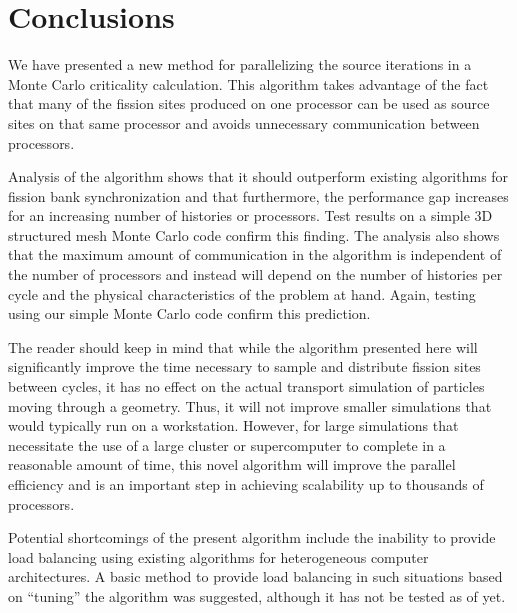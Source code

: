 \section{Conclusions}
\label{sec:conclusions}

We have presented a new method for parallelizing the source iterations
in a Monte Carlo criticality calculation. This algorithm takes
advantage of the fact that many of the fission sites produced on one
processor can be used as source sites on that same processor and
avoids unnecessary communication between processors.

Analysis of the algorithm shows that it should outperform existing
algorithms for fission bank synchronization and that furthermore, the
performance gap increases for an increasing number of histories or
processors. Test results on a simple 3D structured mesh Monte Carlo
code confirm this finding. The analysis also shows that the maximum
amount of communication in the algorithm is independent of the number
of processors and instead will depend on the number of histories per
cycle and the physical characteristics of the problem at hand. Again,
testing using our simple Monte Carlo code confirm this prediction.

The reader should keep in mind that while the algorithm presented here
will significantly improve the time necessary to sample and distribute
fission sites between cycles, it has no effect on the actual transport
simulation of particles moving through a geometry. Thus, it will not
improve smaller simulations that would typically run on a
workstation. However, for large simulations that necessitate the use
of a large cluster or supercomputer to complete in a reasonable amount
of time, this novel algorithm will improve the parallel efficiency and
is an important step in achieving scalability up to thousands of
processors.

Potential shortcomings of the present algorithm include the inability
to provide load balancing using existing algorithms for heterogeneous
computer architectures. A basic method to provide load balancing in
such situations based on ``tuning'' the algorithm was suggested,
although it has not be tested as of yet.

